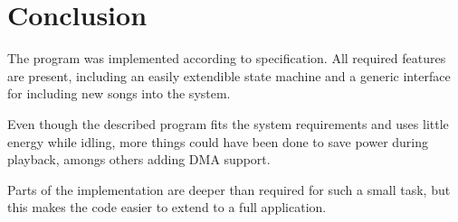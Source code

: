\section{Conclusion}
The program was implemented according to specification. All required features are present, including an easily extendible state machine and a generic interface for including new songs into the system.

Even though the described program fits the system requirements and uses little energy while idling, more things could have been done to save power during playback, amongs others adding DMA support.

Parts of the implementation are deeper than required for such a small task, but this makes the code easier to extend to a full application.

